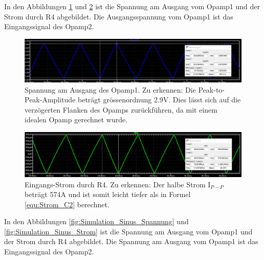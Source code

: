 \newpage

In den Abbildungen \ref{fig:Simulation_Dreieck_Spannung} und \ref{fig:Simulation_Dreieck_Strom} ist die Spannung am Ausgang vom Opamp1 und der Strom durch R4 abgebildet. Die Ausgangsspannung vom Opamp1 ist das Eingangssignal des Opamp2. 

\begin{figure}[h!]
	\centering
	\includegraphics[width=\textwidth]{graphics/Spannung_Ua_1.png}
	\caption{Spannung am Ausgang des Opamp1. Zu erkennen: Die Peak-to-Peak-Amplitude beträgt grössenordnung 2.9V. Dies lässt sich auf die verzögerten Flanken des Opamps zurückführen, da mit einem idealen Opamp gerechnet wurde.}
	\label{fig:Simulation_Dreieck_Spannung}
\end{figure}

\begin{figure}[h!]
	\centering
	\includegraphics[width=\textwidth]{graphics/Strom_Ir_2.png}
	\caption{Eingangs-Strom durch R4. Zu erkennen: Der halbe Strom I$_{P-P}$ beträgt 574\textmu A und ist somit leicht tiefer als in Formel \ref{equ:Strom_C2} berechnet.
	}
	\label{fig:Simulation_Dreieck_Strom}
\end{figure}


In den Abbildungen \ref{fig:Simulation_Sinus_Spannung} und \ref{fig:Simulation_Sinus_Strom} ist die Spannung am Ausgang vom Opamp1 und der Strom durch R4 abgebildet. Die Spannung am Ausgang vom Opamp1 ist das Eingangssignal des Opamp2.  

